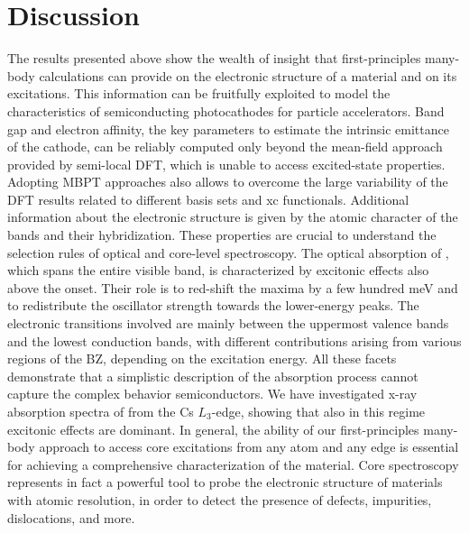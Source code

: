 \documentclass[aps,pra,superscriptaddress,twocolumn]{revtex4}
\begin{document}
\section{Discussion}
\label{section:discussion}
The results presented above show the wealth of insight that first-principles many-body calculations can provide on the electronic structure of a material and on its excitations.
This information can be fruitfully exploited to model the characteristics of semiconducting photocathodes for particle accelerators. 
Band gap and electron affinity, the key parameters to estimate the intrinsic emittance of the cathode, can be reliably computed only beyond the mean-field approach provided by semi-local DFT, which is unable to access excited-state properties.
Adopting MBPT approaches also allows to overcome the large variability of the DFT results related to different basis sets and xc functionals.
Additional information about the electronic structure is given by the atomic character of the bands and their hybridization.
These properties are crucial to understand the selection rules of optical and core-level spectroscopy.
The optical absorption of , which spans the entire visible band, is characterized by excitonic effects also above the onset.
Their role is to red-shift the maxima by a few hundred meV and to redistribute the oscillator strength towards the lower-energy peaks. 
The electronic transitions involved are mainly between the uppermost valence bands and the lowest conduction bands, with different contributions arising from various regions of the BZ, depending on the excitation energy. 
All these facets demonstrate that a simplistic description of the absorption process cannot capture the complex behavior semiconductors.
We have investigated x-ray absorption spectra of  from the Cs $L_3$-edge, showing that also in this regime excitonic effects are dominant.
In general, the ability of our first-principles many-body approach to access core excitations from any atom and any edge is essential for achieving a comprehensive characterization of the material.
Core spectroscopy represents in fact a powerful tool to probe the electronic structure of materials with atomic resolution, in order to detect the presence of defects, impurities, dislocations, and more.
\end{document}
